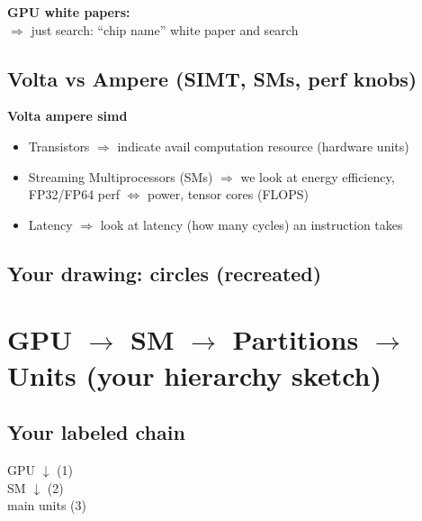 \documentclass[11pt]{article}
\newcommand{\blue}[1]{\textcolor{myblue}{#1}}
\begin{document}
\textbf{GPU white papers:}\\
$\Rightarrow$ just search: ``chip name'' white paper and search

\subsection*{\blue{Volta vs Ampere (SIMT, SMs, perf knobs)}}
\textbf{Volta ampere simd}\\
\begin{itemize}
\item Transistors $\Rightarrow$ indicate avail computation resource (hardware units)
\item Streaming Multiprocessors (SMs) $\Rightarrow$ we look at energy efficiency, FP32/FP64 perf $\Leftrightarrow$ power, tensor cores (FLOPS)
\item Latency $\Rightarrow$ look at latency (how many cycles) an instruction takes
\end{itemize}

\subsection*{\blue{Your drawing: circles (recreated)}}
\begin{center}
\end{center}

\section{\blue{GPU $\rightarrow$ SM $\rightarrow$ Partitions $\rightarrow$ Units (your hierarchy sketch)}}

\subsection*{\blue{Your labeled chain}}
GPU $\downarrow$ (1)\\
SM $\downarrow$ (2)\\
main units (3)
\end{document}
